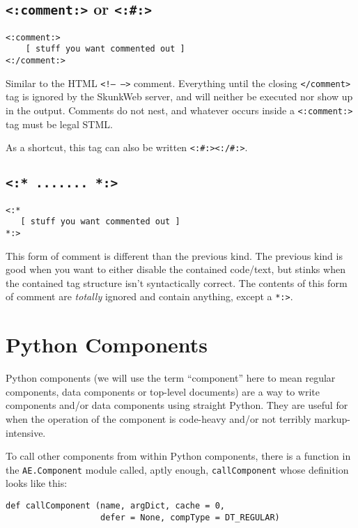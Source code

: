 \documentclass{manual}
\begin{document}
\section{\texttt{<:comment:>} or \texttt{<:\#:>}}
\label{tagcomment}

\begin{verbatim}
<:comment:>
    [ stuff you want commented out ]
<:/comment:>
\end{verbatim}

Similar to the HTML \texttt{<!-- -->} comment. Everything until
the closing \texttt{</comment>} tag is ignored by the SkunkWeb server,
and will neither be executed nor show up in the output. 
Comments do not nest,
and whatever occurs inside a \texttt{<:comment:>} tag must
be legal STML. 

As a shortcut, this tag can also be written
\texttt{<:\#:><:/\#:>}.

   


\section{\texttt{<:* ....... *:>}}
\label{fullcomment}
\begin{verbatim}
<:*
   [ stuff you want commented out ]
*:>
\end{verbatim}

This form of comment is different than the previous kind.  The
previous kind is good when you want to either disable the contained
code/text, but stinks when the contained tag structure isn't
syntactically correct.  The contents of this form of comment are
\emph{totally} ignored and contain anything, except a \texttt{*:>}.


\chapter{Python Components}
\label{pythoncode}
Python components (we will use the term ``component'' here to mean
regular components, data components or top-level documents) 
are a way to write components and/or data components using straight
Python.  They are useful for when the operation of the component is
code-heavy and/or not terribly markup-intensive.

To call other components from within Python components, there is a
function in the \texttt{AE.Component} module called, aptly enough,
\texttt{callComponent} whose definition looks like this:

\begin{verbatim}
def callComponent (name, argDict, cache = 0,
                   defer = None, compType = DT_REGULAR)
\end{verbatim}
\end{document}
